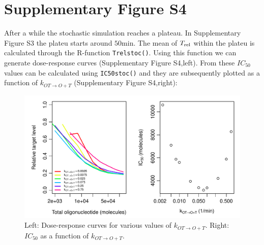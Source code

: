\documentclass[a4paper,11pt]{article}
\newenvironment{Ncenter}{%
  \setlength\topsep{-10pt}
  \setlength\parskip{-100pt}
  \begin{center}
}{%
  \end{center}
}
\newcommand{\kmo}{k_{OT \to O+T}}
\newcommand{\Trel}{T_{\rm{rel}}}
\begin{document}
\section{Supplementary Figure S4}
After a while the stochastic simulation reaches a plateau. In Supplementary Figure S3 the plateu starts around $50$min. The mean of $\Trel$ within the plateu is calculated through the R-function \texttt{Trelstoc()}. Using this function we can generate dose-response curves (Supplementary Figure S4,left). From these $IC_{50}$ values can be calculated using \texttt{IC50stoc()} and they are subsequently plotted as a function of $\kmo$ (Supplementary Figure S4,right):
\begin{Schunk}
\end{Schunk}
\begin{figure}[!h]
\begin{Ncenter}
\includegraphics[width=\textwidth]{SuppFile1-IC50.pdf}
\end{Ncenter}
\caption{Left: Dose-response curves for various values of $\kmo$. Right: $IC_{50}$ as a function of $\kmo$.}\label{fig:figIC50}
\end{figure}
\newpage

\end{document}
